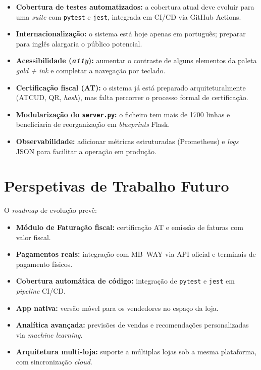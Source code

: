 \documentclass[11pt,a4paper]{report}
\begin{document}
\begin{itemize}
  \item \textbf{Cobertura de testes automatizados:} a cobertura atual deve evoluir para uma \textit{suite} com \texttt{pytest} e \texttt{jest}, integrada em CI/CD via GitHub Actions.
  \item \textbf{Internacionalização:} o sistema está hoje apenas em português; preparar para inglês alargaria o público potencial.
  \item \textbf{Acessibilidade (\textit{a11y}):} aumentar o contraste de alguns elementos da paleta \textit{gold + ink} e completar a navegação por teclado.
  \item \textbf{Certificação fiscal (AT):} o sistema já está preparado arquiteturalmente (ATCUD, QR, \textit{hash}), mas falta percorrer o processo formal de certificação.
  \item \textbf{Modularização do \texttt{server.py}:} o ficheiro tem mais de 1700 linhas e beneficiaria de reorganização em \textit{blueprints} Flask.
  \item \textbf{Observabilidade:} adicionar métricas estruturadas (Prometheus) e \textit{logs} JSON para facilitar a operação em produção.
\end{itemize}

\section{Perspetivas de Trabalho Futuro}
O \textit{roadmap} de evolução prevê:

\begin{itemize}
  \item \textbf{Módulo de Faturação fiscal:} certificação AT e emissão de faturas com valor fiscal.
  \item \textbf{Pagamentos reais:} integração com MB~WAY via API oficial e terminais de pagamento físicos.
  \item \textbf{Cobertura automática de código:} integração de \texttt{pytest} e \texttt{jest} em \textit{pipeline} CI/CD.
  \item \textbf{App nativa:} versão móvel para os vendedores no espaço da loja.
  \item \textbf{Analítica avançada:} previsões de vendas e recomendações personalizadas via \textit{machine learning}.
  \item \textbf{Arquitetura multi-loja:} suporte a múltiplas lojas sob a mesma plataforma, com sincronização \textit{cloud}.
\end{itemize}
\end{document}
